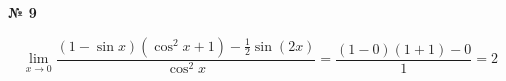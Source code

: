 \documentclass{article}
\begin{document}
\textbf{№ 9} 

\begingroup
\Large

$$ \lim\limits_{x \to 0} \frac{(1-\sin{x})(\cos^2{x}+1) - \frac{1}{2}\sin{(2x)}}{\cos^2{x}}
= \frac{(1-0)(1+1) - 0}{1}
= 2 $$

\endgroup
\end{document}
